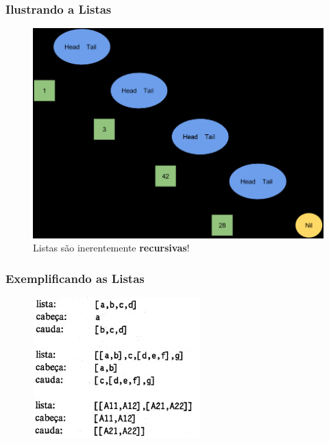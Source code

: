 \begin{frame}
  \frametitle{Ilustrando a Listas}
\begin{figure}[!htb]
\centering
\includegraphics[width=.7\textwidth, height=0.650\textheight]{figures/ilustra-lista-02.jpg}
\caption{Listas são inerentemente \textbf{recursivas}!}
\end{figure}
\end{frame}



\begin{frame}
 \frametitle{Exemplificando as Listas}
\begin{figure}[!htb]
\centering
\includegraphics[width=.7\textwidth, height=0.650\textheight]{figures/exemplo_listas_01.jpg}
\end{figure}
\end{frame}

